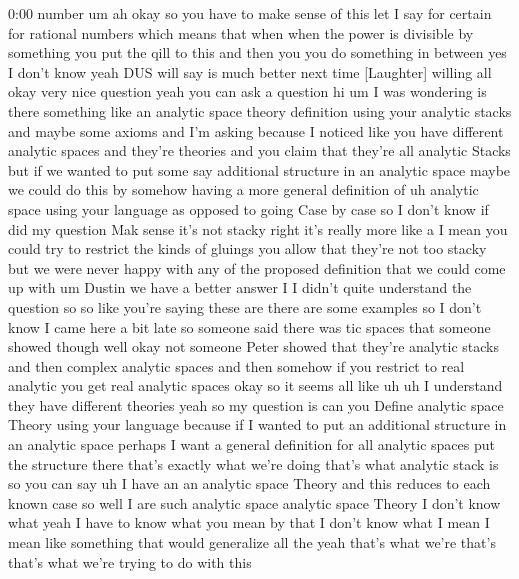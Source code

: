 \begin{unfinished}{0:00}
number  um  ah  okay  so  you  have  to  make
sense  of  this  let  I  say  for  certain  for
rational  numbers  which  means  that  when
when  the  power  is  divisible  by  something
you  put  the  qill  to  this  and  then  you
you  do  something  in  between
yes  I  don't  know
yeah  DUS  will  say  is  much  better  next
time
[Laughter]
willing
all
okay  very  nice  question  yeah  you  can  ask
a
question  hi  um  I  was  wondering  is  there
something  like  an  analytic  space  theory
definition  using  your  analytic  stacks
and  maybe  some  axioms  and  I'm  asking
because  I  noticed  like  you  have
different  analytic  spaces  and  they're
theories  and  you  claim  that  they're  all
analytic  Stacks  but  if  we  wanted  to  put
some  say  additional  structure  in  an
analytic  space  maybe  we  could  do  this  by
somehow  having  a  more  general  definition
of  uh  analytic  space  using  your  language
as  opposed  to  going  Case  by  case  so
I  don't  know  if  did  my  question  Mak
sense  it's  not  stacky  right  it's  really
more  like
a  I  mean  you  could  try  to
restrict  the  kinds  of  gluings  you  allow
that  they're  not  too  stacky  but  we  were
never  happy  with  any  of  the  proposed
definition  that  we  could  come  up  with
um  Dustin  we  have  a  better  answer  I  I
didn't  quite  understand  the  question  so
so  like  you're  saying  these  are  there
are  some  examples  so  I  don't  know  I  came
here  a  bit  late  so  someone  said  there
was  tic
spaces  that  someone  showed  though  well
okay  not  someone  Peter  showed  that
they're  analytic  stacks  and  then  complex
analytic  spaces  and  then  somehow  if  you
restrict  to  real  analytic  you  get  real
analytic  spaces  okay  so  it  seems  all
like
uh  uh  I  understand  they  have  different
theories  yeah  so  my  question  is  can  you
Define  analytic  space  Theory  using  your
language  because  if  I  wanted  to  put  an
additional  structure  in  an  analytic
space  perhaps  I  want  a  general
definition  for  all  analytic  spaces  put
the  structure  there  that's  exactly  what
we're  doing  that's  what  analytic  stack
is  so  you  can  say  uh  I  have  an  an
analytic  space  Theory  and  this  reduces
to  each  known  case  so
well  I  are  such  analytic  space  analytic
space  Theory  I  don't  know  what  yeah  I
have  to  know  what  you  mean  by  that  I
don't  know  what  I  mean  I  mean  like
something  that  would  generalize  all  the
yeah  that's  what  we're  that's  that's
what  we're  trying  to  do  with  this

\end{unfinished}
